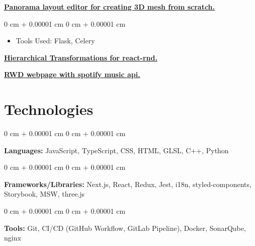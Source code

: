 \documentclass[10pt, letterpaper]{article}
\newenvironment{highlights}{
    \begin{itemize}[
        topsep=0.10 cm,
        parsep=0.10 cm,
        partopsep=0pt,
        itemsep=0pt,
        leftmargin=0 cm + 10pt
    ]
}{
    \end{itemize}
} %
\newenvironment{onecolentry}{
    \begin{adjustwidth}{
        0 cm + 0.00001 cm
    }{
        0 cm + 0.00001 cm
    }
}{
    \end{adjustwidth}
} %
\begin{document}
        \vspace{0.2 cm}

        \href{https://github.com/tsengyushiang/pano-to-mesh}{\textbf{Panorama layout editor for creating 3D mesh from scratch.}}
        \vspace{0.10 cm}
        \begin{onecolentry}
            \begin{highlights}
                \item Tools Used: Flask, Celery
            \end{highlights}
        \end{onecolentry}

        \vspace{0.2 cm}

        \href{https://github.com/tsengyushiang/react-rnd-group}{\textbf{Hierarchical Transformations for react-rnd.}}

        \vspace{0.2 cm}
        \href{https://spotify-kappa-three.vercel.app/}{\textbf{RWD webpage with spotify music api.}}
        

    \section{Technologies}

        \begin{onecolentry}
            \textbf{Languages:} JavaScript, TypeScript, CSS, HTML, GLSL, C++, Python
        \end{onecolentry}

        \vspace{0.2 cm}

        \begin{onecolentry}
            \textbf{Frameworks/Libraries:} Next.js, React, Redux, Jest, i18n, styled-components, Storybook, MSW, three.js
        \end{onecolentry}

        \vspace{0.2 cm}

        \begin{onecolentry}
            \textbf{Tools:} Git, CI/CD (GitHub Workflow, GitLab Pipeline), Docker, SonarQube, nginx
        \end{onecolentry}
\end{document}
